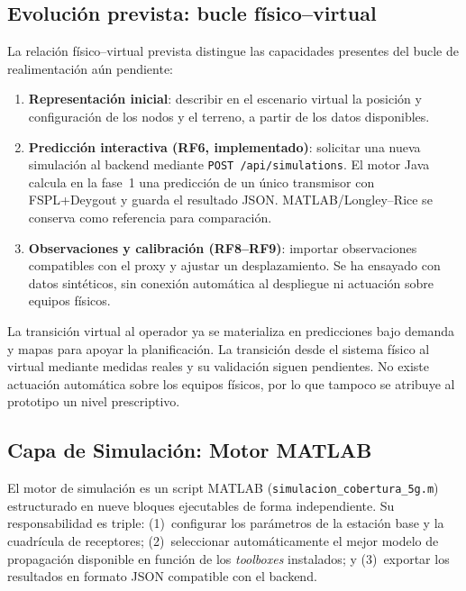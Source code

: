 \subsection{Evolución prevista: bucle físico--virtual}
\label{subsec:bucle_fisico_virtual}

La relación físico--virtual prevista distingue las capacidades presentes del bucle de
realimentación aún pendiente:

\begin{enumerate}
  \item \textbf{Representación inicial}: describir en el escenario virtual la posición y
    configuración de los nodos y el terreno, a partir de los datos disponibles.
  \item \textbf{Predicción interactiva (RF6, implementado)}: solicitar una nueva
    simulación al backend mediante \texttt{POST /api/simulations}. El motor Java calcula
    en la fase~1 una predicción de un único transmisor con FSPL+Deygout y guarda el resultado JSON.
    MATLAB/Longley--Rice se conserva como referencia para comparación.
  \item \textbf{Observaciones y calibración (RF8--RF9)}: importar observaciones compatibles
    con el proxy y ajustar un desplazamiento. Se ha ensayado con datos sintéticos, sin
    conexión automática al despliegue ni actuación sobre equipos físicos.
\end{enumerate}

La transición virtual al operador ya se materializa en predicciones bajo demanda y mapas
para apoyar la planificación. La transición desde el sistema físico al virtual mediante
medidas reales y su validación siguen pendientes. No existe actuación automática sobre
los equipos físicos, por lo que tampoco se atribuye al prototipo un nivel prescriptivo.

\subsection{Capa de Simulación: Motor MATLAB}
\label{subsec:arq_matlab}

El motor de simulación es un script MATLAB (\lstinline{simulacion_cobertura_5g.m})
estructurado en nueve bloques ejecutables de forma independiente. Su responsabilidad es
triple: (1)~configurar los parámetros de la estación base y la cuadrícula de receptores;
(2)~seleccionar automáticamente el mejor modelo de propagación disponible en función de los
\textit{toolboxes} instalados; y (3)~exportar los resultados en formato JSON compatible con
el backend.

